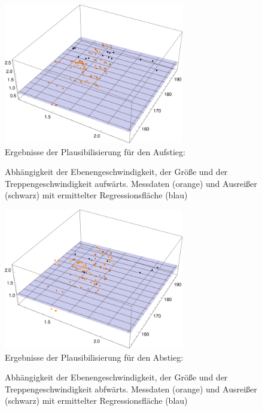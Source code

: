 	
	
	
	\begin{figure}[htpb]
		\centering
		\includegraphics[width=0.7\textwidth]{abbildungen/regression/2012_2017_verbund/ohneausreisser/auf-ebene-groesse.pdf}
		\justify \ \\
		Ergebnisse der Plausibilisierung für den Aufstieg:
		
		\caption{Abhängigkeit der Ebenengeschwindigkeit, der Größe und der Treppengeschwindigkeit aufwärts. Messdaten (orange) und Ausreißer (schwarz) mit ermittelter Regressionsfläche (blau)}
		\label{fig:2012_und_2017_OA_auf_ebene_groesse}
	\end{figure}
	
	
	
	\begin{figure}[htpb]
		\centering
		\includegraphics[width=0.7\textwidth]{abbildungen/regression/2012_2017_verbund/ohneausreisser/ab-ebene-groesse.pdf}
		\justify \ \\
		Ergebnisse der Plausibilisierung für den Abstieg:
		
		\caption{Abhängigkeit der Ebenengeschwindigkeit, der Größe und der Treppengeschwindigkeit abfwärts. Messdaten (orange) und Ausreißer (schwarz) mit ermittelter Regressionsfläche (blau)}
		\label{fig:2012_und_2017_OA_ab_ebene_groesse}
	\end{figure}
	
